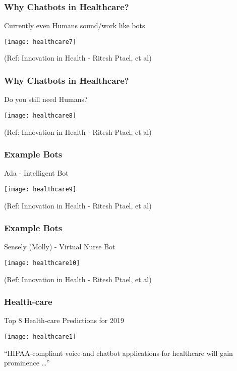 \begin{frame}[fragile]\frametitle{Why Chatbots in Healthcare?}
Currently even Humans sound/work like bots

\begin{center}
\texttt{[image: healthcare7]}
\end{center}

{\tiny (Ref: Innovation in Health - Ritesh Ptael, et al)}
\end{frame}

\begin{frame}[fragile]\frametitle{Why Chatbots in Healthcare?}
Do you still need Humans?


\begin{center}
\texttt{[image: healthcare8]}
\end{center}

{\tiny (Ref: Innovation in Health - Ritesh Ptael, et al)}
\end{frame}

\begin{frame}[fragile]\frametitle{Example Bots}
Ada - Intelligent Bot

\begin{center}
\texttt{[image: healthcare9]}
\end{center}

{\tiny (Ref: Innovation in Health - Ritesh Ptael, et al)}
\end{frame}

\begin{frame}[fragile]\frametitle{Example Bots}
Sensely (Molly) - Virtual Nurse Bot

\begin{center}
\texttt{[image: healthcare10]}
\end{center}

{\tiny (Ref: Innovation in Health - Ritesh Ptael, et al)}
\end{frame}



\begin{frame}[fragile]\frametitle{Health-care}
Top 8 Health-care Predictions for 2019

\begin{center}
\texttt{[image: healthcare1]}
\end{center}

``HIPAA-compliant voice and chatbot applications for healthcare will gain prominence \ldots''

\end{frame}

